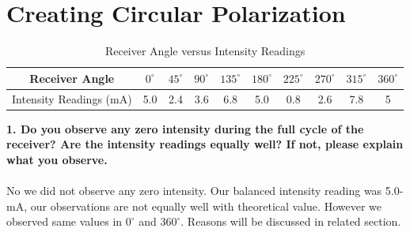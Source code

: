 \documentclass[a4paper,12pt]{report}
\begin{document}
\section{Creating Circular Polarization}
\begin{table}[h]
	\begin{center}
\begin{tabular}{|c|c|c|c|c|c|c|c|c|c|}
	\hline Receiver Angle & $0^{\circ}$ & $45^{\circ}$ & $90^{\circ}$ & $135^{\circ}$ & $180^{\circ}$ & $225^{\circ}$ & $270^{\circ}$ & $315^{\circ}$ & $360^{\circ}$ \\ 
	\hline Intensity Readings (mA) & 5.0 & 2.4 & 3.6 & 6.8 & 5.0 & 0.8 & 2.6 & 7.8 & 5 \\ 
	\hline 
\end{tabular} 
\end{center}
\caption{Receiver Angle versus Intensity Readings}
\end{table}
\textbf{1. Do you observe any zero intensity during the full cycle of the receiver? Are the intensity readings equally well? If not, please explain what you observe.}\\\\
No we did not observe any zero intensity. Our balanced intensity reading was 5.0-mA, our observations are not equally well with theoretical value. However we observed same values in $0^{\circ}$ and $360^{\circ}$. Reasons will be discussed in related section.
\end{document}
